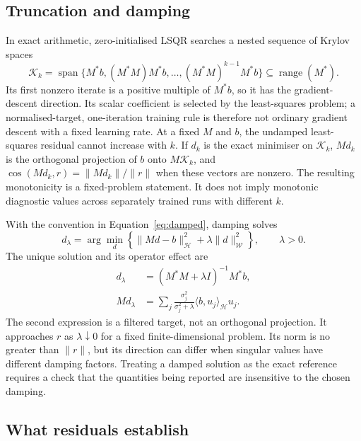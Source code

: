 \documentclass{article}
\theoremstyle{definition}
\theoremstyle{remark}
\begin{document}
\subsection{Truncation and damping}

In exact arithmetic, zero-initialised LSQR searches a nested sequence of Krylov spaces
\begin{equation}
 \mathcal K_k=\operatorname{span}\{M^*b,(M^*M)M^*b,\ldots,(M^*M)^{k-1}M^*b\}
 \subseteq\operatorname{range}(M^*).
\end{equation}
Its first nonzero iterate is a positive multiple of $M^*b$, so it has the gradient-descent direction. Its scalar coefficient is selected by the least-squares problem; a normalised-target, one-iteration training rule is therefore not ordinary gradient descent with a fixed learning rate. At a fixed $M$ and $b$, the undamped least-squares residual cannot increase with $k$. If $d_k$ is the exact minimiser on $\mathcal K_k$, $Md_k$ is the orthogonal projection of $b$ onto $M\mathcal K_k$, and
$\cos(Md_k,r)=\|Md_k\|/\|r\|$ when these vectors are nonzero. The resulting monotonicity is a fixed-problem statement. It does not imply monotonic diagnostic values across separately trained runs with different $k$.

With the convention in Equation~\eqref{eq:damped}, damping solves
\begin{equation}
 d_\lambda=\arg\min_d\left\{\|Md-b\|_{\mathcal H}^2+\lambda\|d\|_{\mathcal W}^2\right\},
 \qquad\lambda>0.
\end{equation}
The unique solution and its operator effect are
\begin{equation}
 \begin{split}
 d_\lambda&=(M^*M+\lambda I)^{-1}M^*b,\\
 Md_\lambda&=\sum_j\frac{\sigma_j^2}{\sigma_j^2+\lambda}
                 \langle b,u_j\rangle_{\mathcal H}u_j.
 \end{split}
 \label{eq:app-damped}
\end{equation}
The second expression is a filtered target, not an orthogonal projection. It approaches $r$ as $\lambda\downarrow0$ for a fixed finite-dimensional problem. Its norm is no greater than $\|r\|$, but its direction can differ when singular values have different damping factors. Treating a damped solution as the exact reference requires a check that the quantities being reported are insensitive to the chosen damping.

\subsection{What residuals establish}
\end{document}
